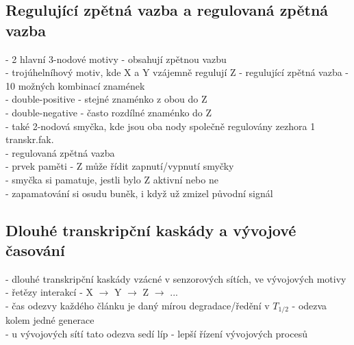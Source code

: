 \documentclass[11pt,a4paper]{report}
\begin{document}
\subsection{Regulující zpětná vazba a regulovaná zpětná vazba}
- 2 hlavní 3-nodové motivy - obsahují zpětnou vazbu\\
\indent - trojúhelníhový motiv, kde X a Y vzájemně regulují Z - regulující zpětná vazba
\indent \indent - 10 možných kombinací znamének\\
\indent \indent \indent -  double-positive - stejné znaménko z obou do Z\\
\indent \indent \indent -  double-negative - často rozdílné znaménko do Z\\
\indent \indent - také 2-nodová smyčka, kde jsou oba nody společně regulovány zezhora 1 transkr.fak.\\ 
\indent \indent \indent - regulovaná zpětná vazba\\
\indent \indent \indent - prvek paměti - Z může řídit zapnutí/vypnutí smyčky\\
\indent \indent \indent \indent - smyčka si pamatuje, jestli bylo Z aktivní nebo ne\\
\indent \indent \indent \indent - zapamatování si osudu buněk, i když už zmizel původní signál\\

\subsection{Dlouhé transkripční kaskády a vývojové časování}
- dlouhé transkripční kaskády vzácné v senzorových sítích, ve vývojových motivy\\
- řetězy interakcí - X $\rightarrow$ Y $\rightarrow$ Z $\rightarrow$ ...\\
- čas odezvy každého článku  je daný mírou degradace/ředění v $T_{1/2}$ - odezva kolem jedné generace\\
\indent - u vývojových sítí tato odezva sedí líp - lepší řízení vývojových procesů\\
\end{document}
